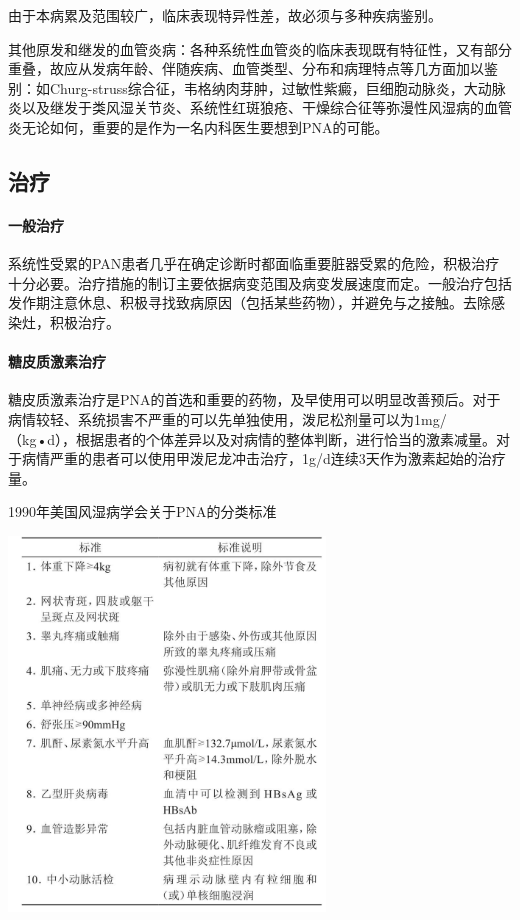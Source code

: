 由于本病累及范围较广，临床表现特异性差，故必须与多种疾病鉴别。

其他原发和继发的血管炎病：各种系统性血管炎的临床表现既有特征性，又有部分重叠，故应从发病年龄、伴随疾病、血管类型、分布和病理特点等几方面加以鉴别：如Churg-struss综合征，韦格纳肉芽肿，过敏性紫癜，巨细胞动脉炎，大动脉炎以及继发于类风湿关节炎、系统性红斑狼疮、干燥综合征等弥漫性风湿病的血管炎无论如何，重要的是作为一名内科医生要想到PNA的可能。

\subsection{治疗}

\paragraph{一般治疗}

系统性受累的PAN患者几乎在确定诊断时都面临重要脏器受累的危险，积极治疗十分必要。治疗措施的制订主要依据病变范围及病变发展速度而定。一般治疗包括发作期注意休息、积极寻找致病原因（包括某些药物），并避免与之接触。去除感染灶，积极治疗。

\paragraph{糖皮质激素治疗}

糖皮质激素治疗是PNA的首选和重要的药物，及早使用可以明显改善预后。对于病情较轻、系统损害不严重的可以先单独使用，泼尼松剂量可以为1mg/（kg•d），根据患者的个体差异以及对病情的整体判断，进行恰当的激素减量。对于病情严重的患者可以使用甲泼尼龙冲击治疗，1g/d连续3天作为激素起始的治疗量。

\begin{table}[htbp]
\centering
\caption{1990年美国风湿病学会关于PNA的分类标准}
\label{tab126-2}
\includegraphics[width=3.3125in,height=3.91667in]{./images/Image00502.jpg}
\end{table}

